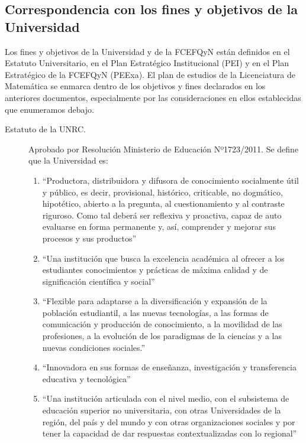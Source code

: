 \documentclass[a4paper, 12pt]{article}
\begin{document}
\subsection{Correspondencia con los fines y objetivos de la Universidad}

Los fines y objetivos de la Universidad y de la FCEFQyN están definidos en el Estatuto Universitario, en el Plan Estratégico Institucional (PEI) y en el Plan Estratégico  de la FCEFQyN (PEExa). El plan de estudios de la Licenciatura de Matemática se enmarca dentro de los objetivos y fines declarados en los anteriores documentos, especialmente por las consideraciones en ellos establecidas  que enumeramos debajo. 


\begin{description}
 \item[Estatuto de la UNRC.]   Aprobado por Resolución Ministerio de Educación Nº1723/2011.  Se define que la Universidad es:
\begin{enumerate}

\item ``Productora, distribuidora y difusora de conocimiento socialmente útil y público, es
decir, provisional, histórico, criticable, no dogmático, hipotético, abierto a la
pregunta, al cuestionamiento y al contraste riguroso. Como tal deberá ser reflexiva
y proactiva, capaz de auto evaluarse en forma permanente y, así, comprender y
mejorar sus procesos y sus productos''


\item ``Una institución que busca la excelencia académica al ofrecer a los estudiantes
conocimientos y prácticas de máxima calidad y de significación científica y social''

\item ``Flexible para adaptarse a la diversificación y expansión de la población estudiantil, 
a las nuevas tecnologías, a las formas de comunicación y producción de
conocimiento, a la movilidad de las profesiones, a la evolución de los paradigmas
de la ciencias y a las nuevas condiciones sociales.''

\item ``Innovadora en sus formas de enseñanza, investigación y transferencia educativa y
tecnológica''

\item ``Una institución articulada con el nivel medio, con el subsistema de educación
superior no universitaria, con otras Universidades de la región, del país y del
mundo y con otras organizaciones sociales y por tener la capacidad de dar
respuestas contextualizadas con lo regional''


\end{enumerate}
\end{description}
\end{document}
